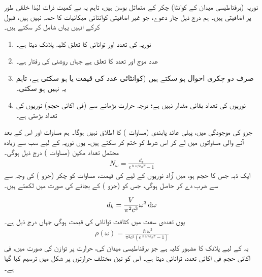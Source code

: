 
نوریہ (برقناطیسی میدان کے کوانٹا) چکر  کے متماثل بوسن ہیں، تاہم یہ بے کمیت ذرات لہٰذا خلقی طور پر اضافیتی ہیں۔ ہم درج ذیل چار دعوے، جو غیر اضافیتی کوانٹائی میکانیات کا حصہ نہیں ہیں، قبول کرکے انہیں یہاں شامل کر سکتے ہیں۔
\begin{enumerate}[1.]
\item
 نوریہ کی تعدد اور توانائی کا تعلق کلیہ پلانک  دیتا ہے۔
\item 
 عدد موج  اور تعدد کا تعلق  ہے جہاں  روشنی کی رفتار ہے۔
 \item
صرف دو چکری احوال ہو سکتے ہیں (کوانٹائی عدد  کی قیمت  یا  ہو سکتی ہے، تاہم یہ  نہیں ہو سکتی۔
\item 
 نوریوں کی تعداد بقائی مقدار نہیں ہے؛ درجہ حرارت بڑھانے سے (فی اکائی حجم) نوریوں کی تعداد بڑھتی ہے۔
\end{enumerate} 
 
 جزو  کی موجودگی میں، پہلی عائد پابندی (مساوات ) کا اطلاق نہیں ہوگا۔ ہم مساوات  اور اس کے بعد آنے والی مساواتوں میں  لے کر اس شرط کو ختم کر سکتے ہیں۔ یوں نوریہ کے لیے سب سے زیادہ محتمل تعداد مکین (مساوات ) درج ذیل ہوگی۔ 
\begin{align}\label{مساوات_مماثل_عدد_مکین}
N_{\omega} = \frac{d_k}{e^{\hslash \omega / k_B T} - 1}
\end{align}
ایک ڈبہ جس کا حجم  ہو، میں آزاد نوریوں کے لیے  کی قیمت، مساوات  کو چکر (جزو ) کی وجہ سے  سے ضرب دے کر حاصل ہوگی، جس کو  (جزو ) کے بجائے  کی صورت میں لکھتے ہیں۔ 

\begin{align} 
d_k = \frac{V}{\pi^2 c^3} \omega^3 \dif \omega
\end{align}
یوں تعددی سعت  میں کثافت توانائی  کی قیمت  ہوگی جہاں  درج ذیل ہے۔
\begin{align}\label{مساوات_متماثل_سیاہ_جسمی_طیف}
\rho (\omega) = \frac{\hslash \omega^3}{\pi^2 c^3 (e^{\hslash \omega / k_B T} - 1)}
\end{align}
یہ  کے لیے پلانک کا مشہور کلیہ ہے جو برقناطیسی میدان کی، حرارت  پر توازن کی صورت میں، فی اکائی حجم فی اکائی تعدد، توانائی دیتا ہے۔ اس کو تین مختلف حرارتوں پر شکل  میں ترسیم کیا گیا ہے۔ 

